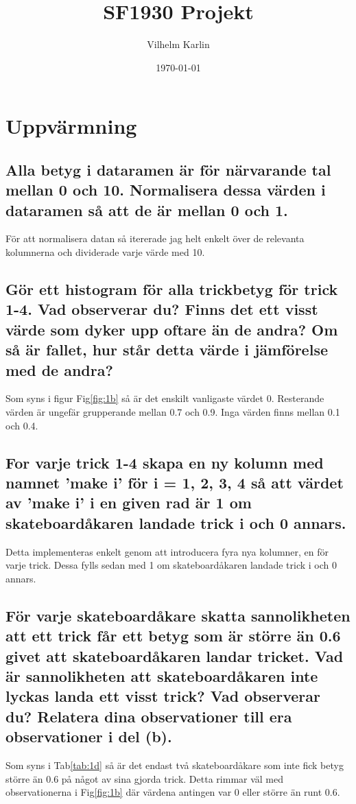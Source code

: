 \documentclass{article}
\title{SF1930 Projekt}
\author{Vilhelm Karlin}
\date{\today}
\begin{document}
\maketitle

\section{Uppvärmning}
\subsection{Alla betyg i dataramen är för närvarande tal mellan 0 och 10. 
Normalisera dessa värden i dataramen så att de är mellan 0 och 1.}

För att normalisera datan så itererade jag helt enkelt över de relevanta kolumnerna och dividerade varje värde med 10. 

\subsection{Gör ett histogram för alla trickbetyg för trick 1-4. Vad observerar du? 
Finns det ett visst värde som dyker upp oftare än de andra? Om så är fallet, hur står detta värde i jämförelse med de andra?}

Som syns i figur Fig\ref{fig:1b} så är det enskilt vanligaste värdet 0. Resterande värden är ungefär grupperande mellan 0.7 och 0.9.
Inga värden finns mellan 0.1 och 0.4.

\subsection{For varje trick 1-4 skapa en ny kolumn med namnet 'make i' för i = 1, 2, 3, 4 så att värdet av 'make i' i en given rad är 1 om skateboardåkaren landade trick i och 0 annars.}
Detta implementeras enkelt genom att introducera fyra nya kolumner, en för varje trick. Dessa fylls sedan med 1 om skateboardåkaren landade trick i och 0 annars.

\subsection{För varje skateboardåkare skatta sannolikheten att ett trick får ett betyg som är större än 0.6 givet att 
skateboardåkaren landar tricket. Vad är sannolikheten att skateboardåkaren inte lyckas landa ett visst trick? Vad observerar du? 
Relatera dina observationer till era observationer i del (b).}

Som syns i Tab\ref{tab:1d} så är det endast två skateboardåkare som inte fick betyg större än 0.6 på något av sina gjorda trick.
Detta rimmar väl med observationerna i Fig\ref{fig:1b} där värdena antingen var 0 eller större än runt 0.6.
\end{document}
